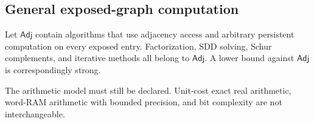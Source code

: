 \subsection{General exposed-graph computation}

Let $\mathsf{Adj}$ contain algorithms that use adjacency access and arbitrary
persistent computation on every exposed entry.  Factorization, SDD solving,
Schur complements, and iterative methods all belong to $\mathsf{Adj}$.  A
lower bound against $\mathsf{Adj}$ is correspondingly strong.

The arithmetic model must still be declared.  Unit-cost exact real arithmetic,
word-RAM arithmetic with bounded precision, and bit complexity are not
interchangeable.
